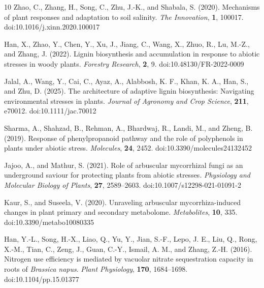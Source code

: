 \documentclass[unnumsec,webpdf,contemporary,large]{oup-authoring-template}%
\theoremstyle{thmstyleone}%
\theoremstyle{thmstyletwo}%
\theoremstyle{thmstylethree}%
\begin{document}
\begin{thebibliography}{10}
Zhao, C., Zhang, H., Song, C., Zhu, J.-K., and Shabala, S. (2020).
Mechanisms of plant responses and adaptation to soil salinity.
\textit{The Innovation}, \textbf{1}, 100017.
doi:10.1016/j.xinn.2020.100017


Han, X., Zhao, Y., Chen, Y., Xu, J., Jiang, C., Wang, X., Zhuo, R., Lu, M.-Z., and Zhang, J. (2022).
Lignin biosynthesis and accumulation in response to abiotic stresses in woody plants.
\textit{Forestry Research}, \textbf{2}, 9.
doi:10.48130/FR-2022-0009

Jalal, A., Wang, Y., Cai, C., Ayaz, A., Alabbosh, K. F., Khan, K. A., Han, S., and Zhu, D. (2025).
The architecture of adaptive lignin biosynthesis: Navigating environmental stresses in plants.
\textit{Journal of Agronomy and Crop Science}, \textbf{211}, e70012.
doi:10.1111/jac.70012

Sharma, A., Shahzad, B., Rehman, A., Bhardwaj, R., Landi, M., and Zheng, B. (2019).
Response of phenylpropanoid pathway and the role of polyphenols in plants under abiotic stress.
\textit{Molecules}, \textbf{24}, 2452.
doi:10.3390/molecules24132452

Jajoo, A., and Mathur, S. (2021).
Role of arbuscular mycorrhizal fungi as an underground saviour for protecting plants from abiotic stresses.
\textit{Physiology and Molecular Biology of Plants}, \textbf{27}, 2589--2603.
doi:10.1007/s12298-021-01091-2

Kaur, S., and Suseela, V. (2020).
Unraveling arbuscular mycorrhiza-induced changes in plant primary and secondary metabolome.
\textit{Metabolites}, \textbf{10}, 335.
doi:10.3390/metabo10080335

Han, Y.-L., Song, H.-X., Liao, Q., Yu, Y., Jian, S.-F., Lepo, J. E., Liu, Q., Rong, X.-M., Tian, C., Zeng, J., Guan, C.-Y., Ismail, A. M., and Zhang, Z.-H. (2016).
Nitrogen use efficiency is mediated by vacuolar nitrate sequestration capacity in roots of \textit{Brassica napus}.
\textit{Plant Physiology}, \textbf{170}, 1684--1698.
doi:10.1104/pp.15.01377


\end{thebibliography}
\end{document}
